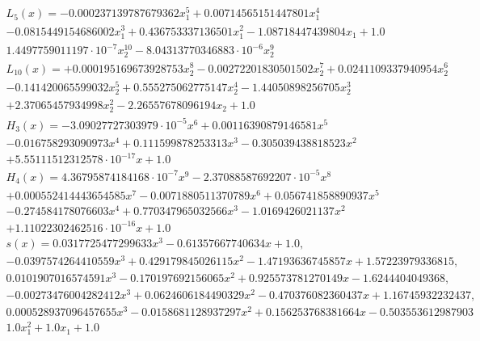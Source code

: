 \documentclass[preprint,12pt]{elsarticle}
\begin{document}

\section{}
\label{}
	\begin{eqnarray}
		L_5(x) = - 0.000237139787679362 x_{1}^{5} + 0.00714565151447801 x_{1}^{4} \\
		- 0.0815449154686002 x_{1}^{3} + 0.436753337136501 x_{1}^{2} - 1.08718447439804 x_{1} + 1.0 \\
		1.4497759011197 \cdot 10^{-7} x_{2}^{10} - 8.04313770346883 \cdot 10^{-6} x_{2}^{9} \\
		L_{10}(x) = + 0.000195169673928753 x_{2}^{8} - 0.00272201830501502 x_{2}^{7} + 0.0241109337940954 x_{2}^{6} \\
		- 0.141420065599032 x_{2}^{5} + 0.555275062775147 x_{2}^{4} - 1.44050898256705 x_{2}^{3} \\
		+ 2.37065457934998 x_{2}^{2} - 2.26557678096194 x_{2} + 1.0 \\
		H_3(x) = - 3.09027727303979 \cdot 10^{-5} x^{6} + 0.00116390879146581 x^{5} \\
		- 0.016758293090973 x^{4} + 0.111599878253313 x^{3} - 0.305039438818523 x^{2} \\
		+ 5.55111512312578 \cdot 10^{-17} x + 1.0 \\
		H_4(x) = 4.36795874184168 \cdot 10^{-7} x^{9} - 2.37088587692207 \cdot 10^{-5} x^{8} \\
		+ 0.000552414443654585 x^{7} - 0.0071880511370789 x^{6} + 0.056741858890937 x^{5} \\
		- 0.274584178076603 x^{4} + 0.770347965032566 x^{3} - 1.0169426021137 x^{2} \\
		+ 1.11022302462516 \cdot 10^{-16} x + 1.0 \\
		s(x) = 0.0317725477299633 x^{3} - 0.61357667740634 x + 1.0, \\
		- 0.0397574264410559 x^{3} + 0.429179845026115 x^{2} - 1.47193636745857 x + 1.57223979336815, \\
		0.0101907016574591 x^{3} - 0.170197692156065 x^{2} + 0.925573781270149 x - 1.6244404049368, \\
		- 0.00273476004282412 x^{3} + 0.0624606184490329 x^{2} - 0.470376082360437 x + 1.16745932232437, \\
		0.000528937096457655 x^{3} - 0.0158681128937297 x^{2} + 0.156253768381664 x - 0.503553612987903 \\
		1.0 x_{1}^{2} + 1.0 x_{1} + 1.0 \\

\end{eqnarray}
\end{document}
